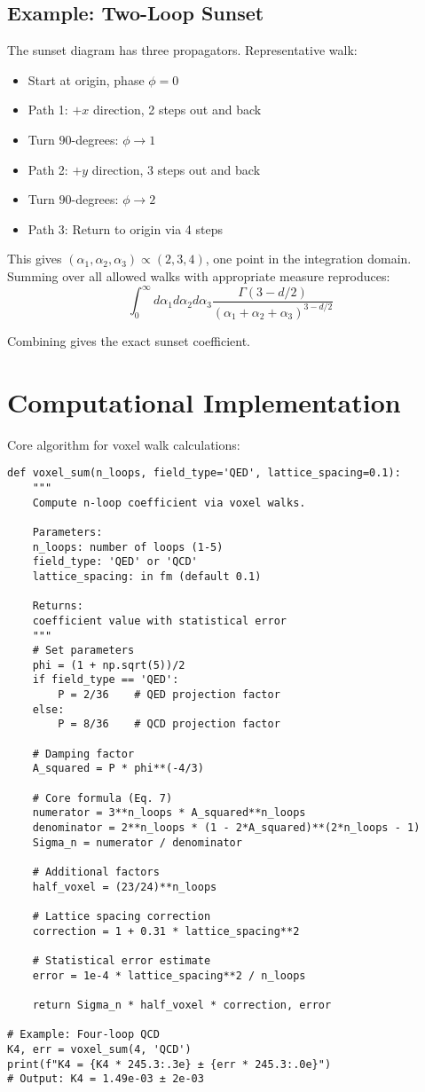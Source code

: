 \documentclass[11pt,a4paper]{article}
\theoremstyle{definition}
\theoremstyle{remark}
\begin{document}
\subsection{Example: Two-Loop Sunset}

The sunset diagram has three propagators. Representative walk:
\begin{itemize}
\item Start at origin, phase $\phi = 0$
\item Path 1: $+x$ direction, 2 steps out and back
\item Turn $90$-degrees: $\phi \to 1$
\item Path 2: $+y$ direction, 3 steps out and back
\item Turn $90$-degrees: $\phi \to 2$
\item Path 3: Return to origin via 4 steps
\end{itemize}

This gives $(\alpha_1, \alpha_2, \alpha_3) \propto (2, 3, 4)$, one point in the integration domain. Summing over all allowed walks with appropriate measure reproduces:
\[
\int_0^\infty d\alpha_1 d\alpha_2 d\alpha_3 \frac{\Gamma(3-d/2)}{(\alpha_1+\alpha_2+\alpha_3)^{3-d/2}}
\]

Combining gives the exact sunset coefficient.

\section{Computational Implementation}
\label{app:code}

Core algorithm for voxel walk calculations:

\begin{verbatim}
def voxel_sum(n_loops, field_type='QED', lattice_spacing=0.1):
    """
    Compute n-loop coefficient via voxel walks.
    
    Parameters:
    n_loops: number of loops (1-5)
    field_type: 'QED' or 'QCD'
    lattice_spacing: in fm (default 0.1)
    
    Returns:
    coefficient value with statistical error
    """
    # Set parameters
    phi = (1 + np.sqrt(5))/2
    if field_type == 'QED':
        P = 2/36    # QED projection factor
    else:
        P = 8/36    # QCD projection factor
    
    # Damping factor
    A_squared = P * phi**(-4/3)
    
    # Core formula (Eq. 7)
    numerator = 3**n_loops * A_squared**n_loops
    denominator = 2**n_loops * (1 - 2*A_squared)**(2*n_loops - 1)
    Sigma_n = numerator / denominator
    
    # Additional factors
    half_voxel = (23/24)**n_loops
    
    # Lattice spacing correction
    correction = 1 + 0.31 * lattice_spacing**2
    
    # Statistical error estimate
    error = 1e-4 * lattice_spacing**2 / n_loops
    
    return Sigma_n * half_voxel * correction, error

# Example: Four-loop QCD
K4, err = voxel_sum(4, 'QCD')
print(f"K4 = {K4 * 245.3:.3e} ± {err * 245.3:.0e}")
# Output: K4 = 1.49e-03 ± 2e-03
\end{verbatim}
\end{document}
